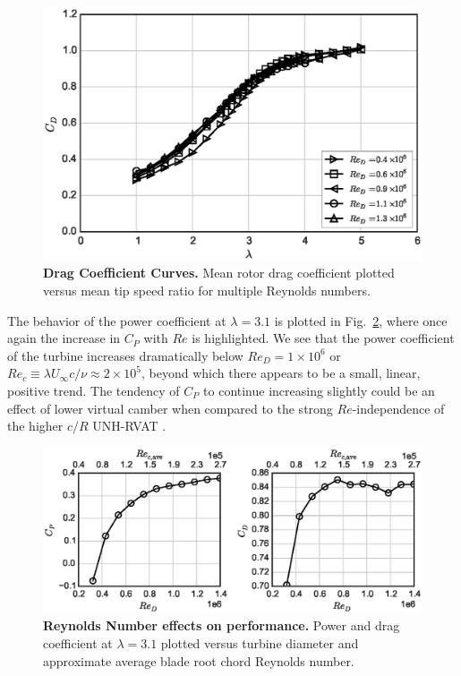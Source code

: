 \documentclass[10pt,letterpaper]{article}
\begin{document}
\begin{figure}[h]
    \includegraphics[width=\textwidth]{figures/cd_curves.eps}

    \caption{{\bf Drag Coefficient Curves.} Mean rotor drag coefficient plotted
    versus mean tip speed ratio for multiple Reynolds numbers.}

    \label{fig:cd-curves}
\end{figure}

The behavior of the power coefficient at $\lambda=3.1$ is plotted in
Fig.~\ref{fig:cp-re-dep}, where once again the increase in $C_P$ with $Re$ is
highlighted. We see that the power coefficient of the turbine increases
dramatically below $Re_D = 1 \times 10^6$ or $Re_c \equiv \lambda U_\infty c /
\nu \approx 2 \times 10^5$, beyond which there appears to be a small, linear,
positive trend. The tendency of $C_P$ to continue increasing slightly could be
an effect of lower virtual camber when compared to the strong $Re$-independence
of the higher $c/R$ UNH-RVAT \cite{Bachant2015-RVAT-Re-dep}.

\begin{figure}[h]
    \includegraphics[width=\textwidth]{figures/perf_re_dep.eps}

    \caption{{\bf Reynolds Number effects on performance.} Power and drag
    coefficient at $\lambda=3.1$ plotted versus turbine diameter and approximate
    average blade root chord Reynolds number.}

    \label{fig:cp-re-dep}
\end{figure}
\end{document}
